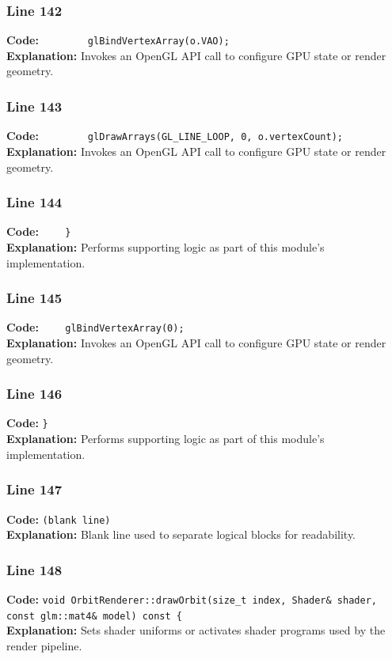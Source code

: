 \documentclass[11pt,a4paper]{article}
\begin{document}
\subsubsection*{Line 142}
\textbf{Code:} \verb|        glBindVertexArray(o.VAO);|\\
\textbf{Explanation:} Invokes an OpenGL API call to configure GPU state or render geometry.

\subsubsection*{Line 143}
\textbf{Code:} \verb|        glDrawArrays(GL_LINE_LOOP, 0, o.vertexCount);|\\
\textbf{Explanation:} Invokes an OpenGL API call to configure GPU state or render geometry.

\subsubsection*{Line 144}
\textbf{Code:} \verb|    }|\\
\textbf{Explanation:} Performs supporting logic as part of this module's implementation.

\subsubsection*{Line 145}
\textbf{Code:} \verb|    glBindVertexArray(0);|\\
\textbf{Explanation:} Invokes an OpenGL API call to configure GPU state or render geometry.

\subsubsection*{Line 146}
\textbf{Code:} \verb|}|\\
\textbf{Explanation:} Performs supporting logic as part of this module's implementation.

\subsubsection*{Line 147}
\textbf{Code:} \texttt{(blank line)}\\
\textbf{Explanation:} Blank line used to separate logical blocks for readability.

\subsubsection*{Line 148}
\textbf{Code:} \verb|void OrbitRenderer::drawOrbit(size_t index, Shader& shader, const glm::mat4& model) const {|\\
\textbf{Explanation:} Sets shader uniforms or activates shader programs used by the render pipeline.
\end{document}
